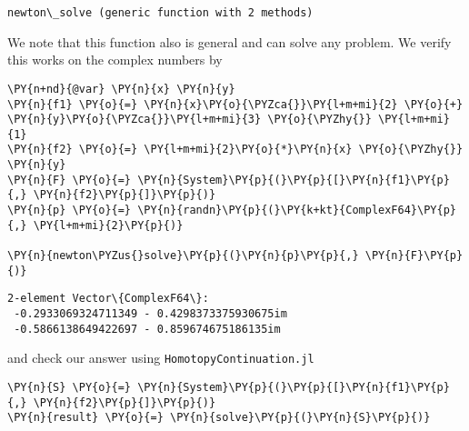 \documentclass[11pt]{article}
\begin{document}
            \begin{tcolorbox}[breakable, size=fbox, boxrule=.5pt, pad at break*=1mm, opacityfill=0]
\begin{Verbatim}[commandchars=\\\{\}]
newton\_solve (generic function with 2 methods)
\end{Verbatim}
\end{tcolorbox}
        
    We note that this function also is general and can solve any problem. We
verify this works on the complex numbers by

    \begin{tcolorbox}[breakable, size=fbox, boxrule=1pt, pad at break*=1mm,colback=cellbackground, colframe=cellborder]
\begin{Verbatim}[commandchars=\\\{\}]
\PY{n+nd}{@var} \PY{n}{x} \PY{n}{y}
\PY{n}{f1} \PY{o}{=} \PY{n}{x}\PY{o}{\PYZca{}}\PY{l+m+mi}{2} \PY{o}{+} \PY{n}{y}\PY{o}{\PYZca{}}\PY{l+m+mi}{3} \PY{o}{\PYZhy{}} \PY{l+m+mi}{1}
\PY{n}{f2} \PY{o}{=} \PY{l+m+mi}{2}\PY{o}{*}\PY{n}{x} \PY{o}{\PYZhy{}} \PY{n}{y}
\PY{n}{F} \PY{o}{=} \PY{n}{System}\PY{p}{(}\PY{p}{[}\PY{n}{f1}\PY{p}{,} \PY{n}{f2}\PY{p}{]}\PY{p}{)}
\PY{n}{p} \PY{o}{=} \PY{n}{randn}\PY{p}{(}\PY{k+kt}{ComplexF64}\PY{p}{,} \PY{l+m+mi}{2}\PY{p}{)}

\PY{n}{newton\PYZus{}solve}\PY{p}{(}\PY{n}{p}\PY{p}{,} \PY{n}{F}\PY{p}{)}
\end{Verbatim}
\end{tcolorbox}

            \begin{tcolorbox}[breakable, size=fbox, boxrule=.5pt, pad at break*=1mm, opacityfill=0]
\begin{Verbatim}[commandchars=\\\{\}]
2-element Vector\{ComplexF64\}:
 -0.2933069324711349 - 0.4298373375930675im
 -0.5866138649422697 - 0.859674675186135im
\end{Verbatim}
\end{tcolorbox}
        
    and check our answer using \texttt{HomotopyContinuation.jl}

    \begin{tcolorbox}[breakable, size=fbox, boxrule=1pt, pad at break*=1mm,colback=cellbackground, colframe=cellborder]
\begin{Verbatim}[commandchars=\\\{\}]
\PY{n}{S} \PY{o}{=} \PY{n}{System}\PY{p}{(}\PY{p}{[}\PY{n}{f1}\PY{p}{,} \PY{n}{f2}\PY{p}{]}\PY{p}{)}
\PY{n}{result} \PY{o}{=} \PY{n}{solve}\PY{p}{(}\PY{n}{S}\PY{p}{)}
\end{Verbatim}
\end{tcolorbox}
\end{document}
